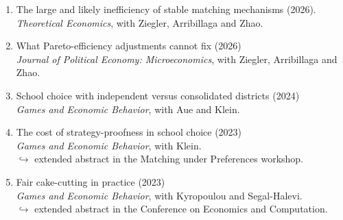 \documentclass[11pt,a4paper]{article}
\begin{document}
\begin{enumerate}[leftmargin=*]
	\item {The large and likely inefficiency of stable matching mechanisms} (2026).\\
\textit{Theoretical Economics}, with Ziegler, Arribillaga and Zhao.

	\item {What Pareto-efficiency adjustments cannot fix} (2026)\\
	\textit{Journal of Political Economy: Microeconomics}, with Ziegler, Arribillaga and Zhao.

	
	\item {School choice with independent versus consolidated districts} (2024)\\
	\textit{Games and Economic Behavior}, with Aue and Klein.
	
	\item {The cost of strategy-proofness in school choice} (2023)\\
	\textit{Games and Economic Behavior}, with Klein.\\
	$\hookrightarrow$ extended abstract in the Matching under Preferences workshop.
	
	\item {Fair cake-cutting in practice} (2023)\\
	\textit{Games and Economic Behavior}, with Kyropoulou and Segal-Halevi.\\
	$\hookrightarrow$ extended abstract in the Conference on Economics and Computation.

\end{enumerate}
\end{document}
